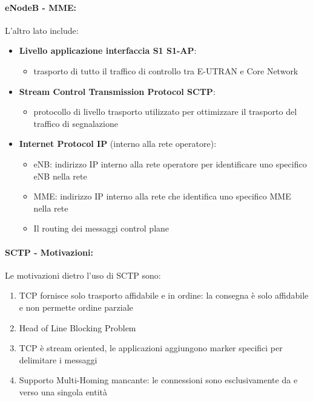 \paragraph{eNodeB - MME:} L'altro lato include: 
\begin{itemize}
	\item \textbf{Livello applicazione interfaccia S1 S1-AP}:
	\begin{itemize}
		\item trasporto di tutto il traffico di controllo tra E-UTRAN e Core Network
	\end{itemize}
	
	\item \textbf{Stream Control Transmission Protocol SCTP}: 
	\begin{itemize}
		\item protocollo di livello trasporto utilizzato per ottimizzare il trasporto del traffico di segnalazione
	\end{itemize}
	
	\item \textbf{Internet Protocol IP} (interno alla rete operatore):
	\begin{itemize}
		\item eNB: indirizzo IP interno alla rete operatore per identificare uno specifico eNB nella rete
	
    	\item MME: indirizzo IP interno alla rete che identifica uno specifico MME nella rete
	
    	\item Il routing dei messaggi control plane
	\end{itemize}
\end{itemize}

\paragraph{SCTP - Motivazioni:} Le motivazioni dietro l'uso di SCTP sono:
\begin{enumerate}
	\item TCP fornisce solo trasporto affidabile e in ordine: la consegna è solo affidabile e non permette ordine parziale
	
    \item Head of Line Blocking Problem
	
    \item TCP è stream oriented, le applicazioni aggiungono marker specifici per delimitare i messaggi
	
    \item Supporto Multi-Homing mancante: le connessioni sono esclusivamente da e verso una singola entità
\end{enumerate}

